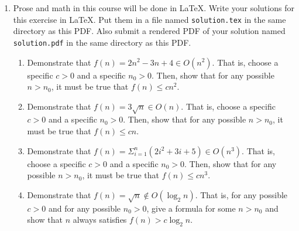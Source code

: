 \documentclass{article}
\begin{document}
\begin{enumerate}
\pagebreak[1]
\item
  Prose and math in this course will be done in \LaTeX{}.  Write your solutions
  for this exercise in \LaTeX{}.  Put them in a file named \texttt{solution.tex}
  in the same directory as this PDF.  Also submit a rendered PDF of your
  solution named \texttt{solution.pdf} in the same directory as this PDF.

  \begin{enumerate}

  \item Demonstrate that
    \(f(n) = 2n^2 - 3n + 4 \in O(n^2)\).
    That is, choose a specific \(c>0\) and a specific \(n_0 > 0\).
    Then, show that for any possible \(n > n_0\), it must be true that
    \(f(n) \leq c n^2\).

  \item Demonstrate that
    \(f(n) = 3 \sqrt{n} \in O(n)\).
    That is, choose a specific \(c>0\) and a specific \(n_0 > 0\).
    Then, show that for any possible \(n > n_0\), it must be true that
    \(f(n) \leq c n\).

  \item Demonstrate that
    \(f(n) = \Sigma_{i=1}^{n} (2i^2+3i+5) \in O(n^3)\).
    That is, choose a specific \(c>0\) and a specific \(n_0 > 0\).
    Then, show that for any possible \(n > n_0\), it must be true that
    \(f(n) \leq c n^3\).

  \item Demonstrate that
    \(f(n) = \sqrt{n} \not\in O(\log_2 n)\).
    That is, for any possible \(c>0\) and for any possible \(n_0 > 0\), give a
    formula for some \(n > n_0\) and show that \(n\) always satisfies
    \(f(n) > c \log_2 n\).

  \end{enumerate}

\end{enumerate}
\end{document}
